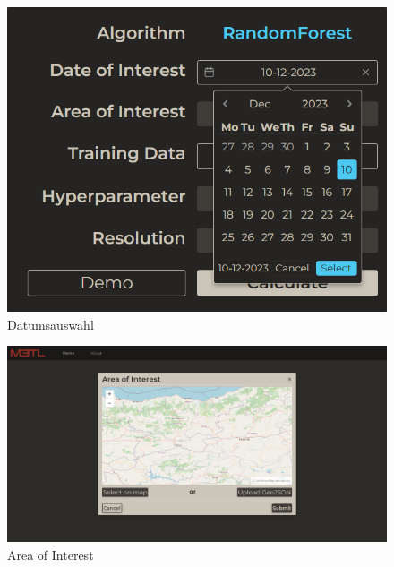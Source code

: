     \begin{figure}[H]
    \centering
    \includegraphics[scale=0.8]{Abbildungen/web-date-picker.png}
    \caption{Datumsauswahl}
    \label{fig:datepicker}
    \end{figure}
    
    \begin{landscape}
    \thispagestyle{empty}
        \begin{figure}[H]
        \centering
        \includegraphics[scale=0.5]{Abbildungen/web-aoi.png}
        \caption{Area of Interest}
        \label{fig:aoi-modal}
    \end{figure}
    \end{landscape}